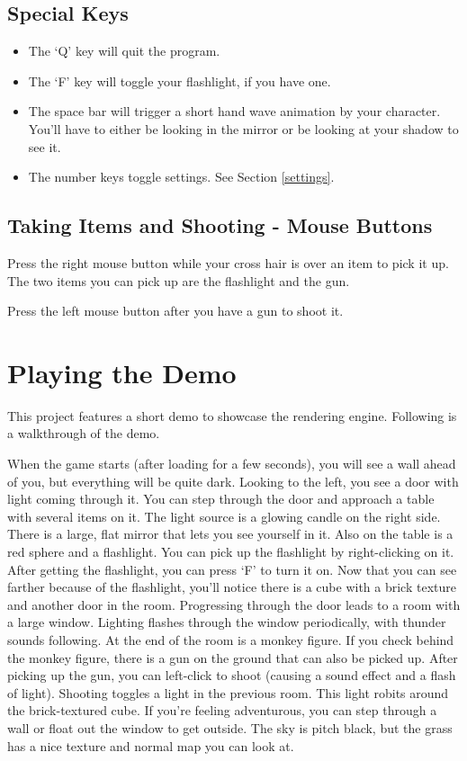 \documentclass[oneside]{book}
\begin{document}
    \subsection{Special Keys}
      \begin{itemize}
        \item The `Q' key will quit the program.
        \item The `F' key will toggle your flashlight, if you have one.
        \item The space bar will trigger a short hand wave animation by your character. You'll have to either be looking in the mirror or be looking at your shadow to see it.
        \item The number keys toggle settings. See Section \ref{settings}.
      \end{itemize}

    \subsection{Taking Items and Shooting - Mouse Buttons}
      Press the right mouse button while your cross hair is over an item to pick it up. The two items you can pick up are the flashlight and the gun.

      Press the left mouse button after you have a gun to shoot it.

  \section{Playing the Demo}
    This project features a short demo to showcase the rendering engine. Following is a walkthrough of the demo.

    When the game starts (after loading for a few seconds), you will see a wall ahead of you, but everything will be quite dark. Looking to the left, you see a door with light coming through it. You can step through the door and approach a table with several items on it. The light source is a glowing candle on the right side. There is a large, flat mirror that lets you see yourself in it. Also on the table is a red sphere and a flashlight. You can pick up the flashlight by right-clicking on it. After getting the flashlight, you can press `F' to turn it on. Now that you can see farther because of the flashlight, you'll notice there is a cube with a brick texture and another door in the room. Progressing through the door leads to a room with a large window. Lighting flashes through the window periodically, with thunder sounds following. At the end of the room is a monkey figure. If you check behind the monkey figure, there is a gun on the ground that can also be picked up. After picking up the gun, you can left-click to shoot (causing a sound effect and a flash of light). Shooting toggles a light in the previous room. This light robits around the brick-textured cube. If you're feeling adventurous, you can step through a wall or float out the window to get outside. The sky is pitch black, but the grass has a nice texture and normal map you can look at.
\end{document}
